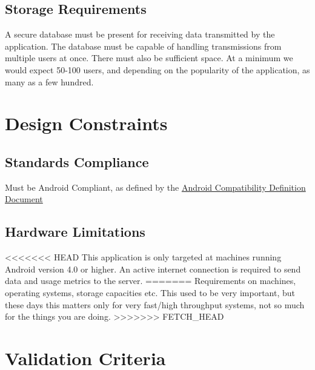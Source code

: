 \documentclass[a4wide]{article}
\begin{document}
\subsection{Storage Requirements}
A secure database must be present for receiving data transmitted by the application.  The database must be capable of handling transmissions from multiple users at once.  There must also be sufficient space.  At a minimum we would expect 50-100 users, and depending on the popularity of the application, as many as a few hundred.



\section{Design Constraints}

\subsection{Standards Compliance}

Must be Android Compliant, as defined by the \href{http://static.googleusercontent.com/media/source.android.com/en/us/compatibility/4.0/android-4.0-cdd.pdf}{Android Compatibility Definition Document}

\subsection{Hardware Limitations}

<<<<<<< HEAD
This application is only targeted at machines running Android version 4.0 or
higher. An active internet connection is required to send data and usage metrics
to the server.
=======
Requirements on machines, operating systems, storage capacities etc.
This used to be very important, but these days this matters only
for very fast/high throughput systems, not so much for the things you
are doing.
>>>>>>> FETCH_HEAD




\section{Validation Criteria}
\end{document}
